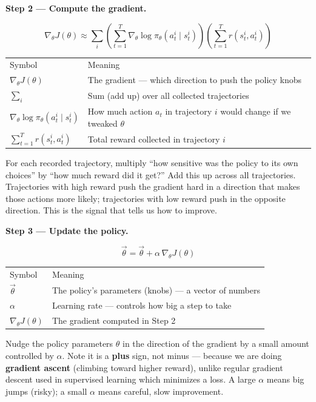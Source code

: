 \medskip
\textbf{Step 2 --- Compute the gradient.}

\[
  \nabla_\theta J(\theta)
  \approx \sum_i
    \left(\sum_{t=1}^T\nabla_\theta\log\pi_\theta(a_t^i\mid s_t^i)\right)
    \left(\sum_{t=1}^T r(s_t^i,a_t^i)\right)
\]

\begin{tabular}{ll}
  Symbol & Meaning \\[4pt]
  $\nabla_\theta J(\theta)$ & The gradient --- which direction to push the policy knobs \\
  $\sum_i$ & Sum (add up) over all collected trajectories \\
  $\nabla_\theta\log\pi_\theta(a_t^i\mid s_t^i)$ & How much action $a_t$ in trajectory $i$ would change if we tweaked $\theta$ \\
  $\sum_{t=1}^T r(s_t^i,a_t^i)$ & Total reward collected in trajectory $i$ \\
\end{tabular}

\medskip
For each recorded trajectory, multiply ``how sensitive was the policy to its own choices'' by
``how much reward did it get?'' Add this up across all trajectories. Trajectories with high
reward push the gradient hard in a direction that makes those actions more likely; trajectories
with low reward push in the opposite direction. This is the signal that tells us how to improve.

\medskip
\textbf{Step 3 --- Update the policy.}

\[
  \vec{\theta} = \vec{\theta} + \alpha\,\nabla_\theta J(\theta)
\]

\begin{tabular}{ll}
  Symbol & Meaning \\[4pt]
  $\vec{\theta}$ & The policy's parameters (knobs) --- a vector of numbers \\
  $\alpha$ & Learning rate --- controls how big a step to take \\
  $\nabla_\theta J(\theta)$ & The gradient computed in Step 2 \\
\end{tabular}

\medskip
Nudge the policy parameters $\theta$ in the direction of the gradient by a small amount
controlled by $\alpha$. Note it is a \textbf{plus} sign, not minus --- because we are doing
\textbf{gradient ascent} (climbing toward higher reward), unlike regular gradient descent used
in supervised learning which minimizes a loss. A large $\alpha$ means big jumps (risky); a
small $\alpha$ means careful, slow improvement.

